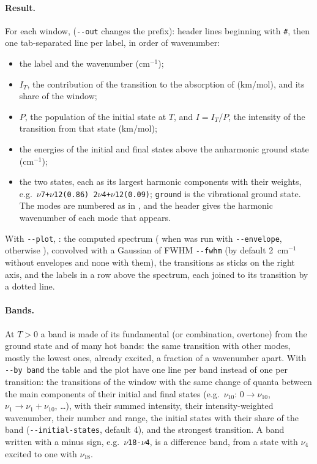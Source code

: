 \paragraph{Result.} For each window, 
(\texttt{-{}-out} changes the prefix): header lines beginning with
\texttt{\#}, then one tab-separated line per label, in order of
wavenumber:
\begin{itemize}
\item the label and the wavenumber (cm$^{-1}$);
\item $I_T$, the contribution of the transition to the absorption of
   (km/mol), and its share of the window;
\item $P$, the population of the initial state at $T$, and $I = I_T/P$,
  the intensity of the transition from that state (km/mol);
\item the energies of the initial and final states above the anharmonic
  ground state (cm$^{-1}$);
\item the two states, each as its largest harmonic components with their
  weights, e.g.\ \texttt{$\nu$7+$\nu$12(0.86) 2$\nu$4+$\nu$12(0.09)};
  \texttt{ground} is the vibrational ground state. The modes are numbered
  as in , and the header gives the harmonic wavenumber of
  each mode that appears.
\end{itemize}
With \texttt{-{}-plot}, : the computed
spectrum ( when 
was run with \texttt{-{}-envelope}, otherwise ),
convolved with a Gaussian of FWHM \texttt{-{}-fwhm} (by default
2~cm$^{-1}$ without envelopes and none with them), the transitions as
sticks on the right axis, and the labels in a row above the spectrum,
each joined to its transition by a dotted line.

\paragraph{Bands.} At $T>0$ a band is made of its fundamental (or
combination, overtone) from the ground state and of many hot bands: the
same transition with other modes, mostly the lowest ones, already
excited, a fraction of a wavenumber apart. With \texttt{-{}-by band} the
table and the plot have one line per band instead of one per transition:
the transitions of the window with the same change of quanta between the
main components of their initial and final states (e.g.\ $\nu_{10}$:
$0\to\nu_{10}$, $\nu_1\to\nu_1+\nu_{10}$, \ldots), with their summed
intensity, their intensity-weighted wavenumber, their number and range,
the initial states with their share of the band
(\texttt{-{}-initial-states}, default 4), and the strongest transition.
A band written with a minus sign, e.g.\ \texttt{$\nu$18-$\nu$4}, is a
difference band, from a state with $\nu_4$ excited to one with $\nu_{18}$.

